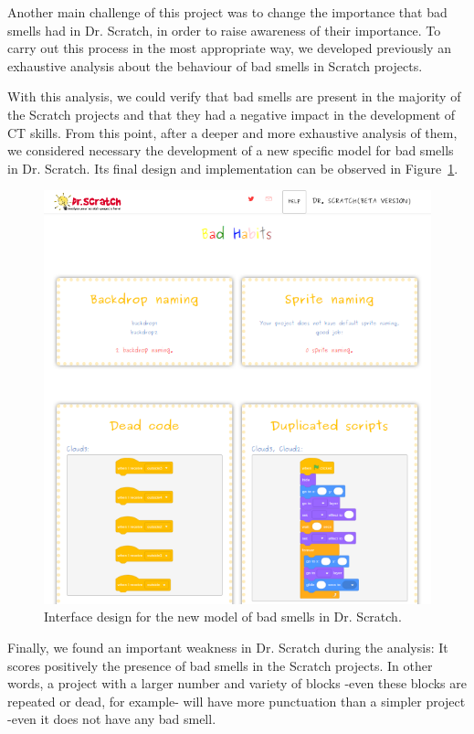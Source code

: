 Another main challenge of this project was to change the importance that bad smells had in Dr. Scratch, in order to raise awareness of their importance. To carry out this process in the most appropriate way, we developed previously an exhaustive analysis about the behaviour of bad smells in Scratch projects.

With this analysis, we could verify that bad smells are present in the majority of the Scratch projects and that they had a negative impact in the development of CT skills. From this point, after a deeper and more exhaustive analysis of them, we considered necessary the development of a new specific model for bad smells in Dr. Scratch. Its final design and implementation can be observed in Figure~\ref{fig:bad_smells_model}.

\begin{figure}
  \centering
  \includegraphics[width=12cm, keepaspectratio]{img/new_model.png}
  \caption{Interface design for the new model of bad smells in Dr. Scratch.}
  \label{fig:bad_smells_model}
\end{figure}

Finally, we found an important weakness in Dr. Scratch during the analysis: It scores positively the presence of bad smells in the Scratch projects. In other words, a project with a larger number and variety of blocks -even these blocks are repeated or dead, for example- will have more punctuation than a simpler project -even it does not have any bad smell. 

